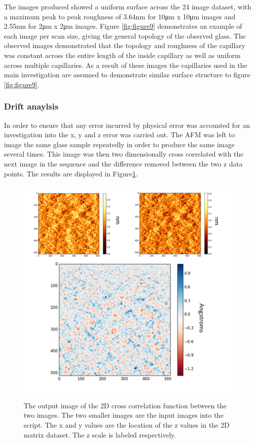 The images produced showed a uniform surface across the 24 image dataset, with a maximum peak to peak roughness of 3.64nm for 10μm x 10μm images and 2.55nm for 2μm x 2μm images. Figure \ref{fig:figure9} demonstrates an example of each image per scan size, giving the general topology of the observed glass.
The observed images demonstrated that the topology and roughness of the capillary was constant across the entire length of the inside capillary as well as uniform across multiple capillaries. As a result of these images the capillaries used in the main investigation are assumed to demonstrate similar surface structure to figure \ref{fig:figure9}.

\subsubsection{Drift anaylsis}

In order to ensure that any error incurred by physical error was accounted for an investigation into the x, y and z error was carried out. The AFM was left to image the same glass sample repeatedly in order to produce the same image several times. This image was then two dimensionally cross correlated with the next image in the sequence and the difference removed between the two z data points. The results are displayed in Figure\ref{fig:CrossCor}.

\begin{figure}[h]     %
        \begin{center}
          \includegraphics[width=120mm]{chapter3/CrossCor.png}
\end{center}
\caption{The output image of the 2D cross correlation function between the two images. The two smaller images are the input images into the script. The x and y values are the location of the z values in the 2D matrix dataset. The z scale is labeled respectively.}
\label{fig:CrossCor}                 %
\end{figure}

